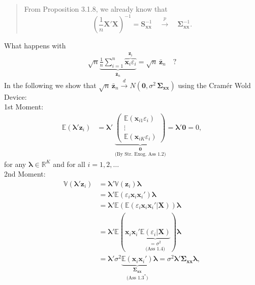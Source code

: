 \documentclass[]{book}
\theoremstyle{definition}
\theoremstyle{definition}
\theoremstyle{definition}
\theoremstyle{remark}
\begin{document}
\begin{quote}
From Proposition 3.1.8, we already know that
\[\left(\frac{1}{n}\mathbf{X}'\mathbf{X}\right)^{-1}=\mathbf{S}_{\mathbf{x}\mathbf{x}}^{-1}\quad\overset{p}\longrightarrow \quad\boldsymbol{\Sigma}_{\mathbf{x}\mathbf{x}}^{-1}.\]
\end{quote}

What happens with \[\begin{align*}
\sqrt{n}\underbrace{\frac{1}{n}\sum_{i=1}^n\overbrace{\mathbf{x}_i\varepsilon_i}^{\mathbf{z}_i}}_{\bar{\mathbf{z}}_n}=\sqrt{n}\,\bar{\mathbf{z}}_n\quad ?\end{align*}\]
In the following we show that
\(\sqrt{n}\,\bar{\mathbf{z}}_n\overset{d}\longrightarrow N(\mathbf{0},\sigma^2\,\boldsymbol{\Sigma}_{\mathbf{x}\mathbf{x}})\)
using the Cramér Wold Device:\\
1st Moment: \[\begin{align*}
\mathbb{E}(\boldsymbol{\lambda}'\mathbf{z}_i)&=
\boldsymbol{\lambda}'\;\underset{\text{(By Str. Exog. Ass 1.2)}}{\underbrace{\left(\begin{matrix}\mathbb{E}(\mathbf{x}_{i1}\varepsilon_i)\\\vdots\\\mathbb{E}(\mathbf{x}_{iK}\varepsilon_i)\end{matrix}\right)}_{\mathbf{0}}}=\boldsymbol{\lambda}'\mathbf{0}=0,\end{align*}\]
for any \(\boldsymbol{\lambda}\in\mathbb{R}^{K}\) and for all
\(i=1,2,\dots\)\\
2nd Moment:
\[\begin{align*}
\mathbb{V}(\boldsymbol{\lambda}'\mathbf{z}_i)
&=\boldsymbol{\lambda}'\mathbb{V}(\mathbf{z}_i)\boldsymbol{\lambda}\\
&=\boldsymbol{\lambda}'\mathbb{E}(\varepsilon_i\mathbf{x}_i\mathbf{x}_i')\boldsymbol{\lambda}\\
&=\boldsymbol{\lambda}'\mathbb{E}(\mathbb{E}(\varepsilon_i\mathbf{x}_i\mathbf{x}_i'|\mathbf{X}))\boldsymbol{\lambda}\\
&=\boldsymbol{\lambda}'\mathbb{E}(\mathbf{x}_i\mathbf{x}_i'\underset{\text{(Ass 1.4)}}{\underbrace{\mathbb{E}(\varepsilon_i|\mathbf{X})}_{=\sigma^2}})\boldsymbol{\lambda}\\
&=\boldsymbol{\lambda}'\sigma^2\underset{\text{(Ass $1.3^\ast$)}}{\underbrace{\mathbb{E}(\mathbf{x}_i\mathbf{x}_i')}_{\boldsymbol{\Sigma}_{\mathbf{x}\mathbf{x}}}}\boldsymbol{\lambda}=\sigma^2\boldsymbol{\lambda}'\boldsymbol{\Sigma}_{\mathbf{x}\mathbf{x}}\boldsymbol{\lambda},\end{align*}\]
\end{document}
